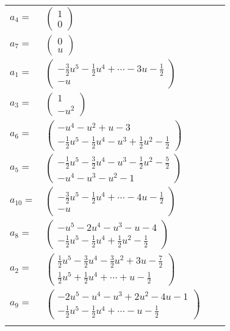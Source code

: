 \documentclass[1p]{elsarticle_modified}
\theoremstyle{definition}
\begin{document}
\begin{tabular}{m{7pt} m{180pt} m{7pt} m{180pt} }
\flushright $a_{4}=$&$\begin{pmatrix}1\\0\end{pmatrix}$ \\
\flushright $a_{7}=$&$\begin{pmatrix}0\\u\end{pmatrix}$ \\
\flushright $a_{1}=$&$\begin{pmatrix}-\frac{3}{2} u^5-\frac{1}{2} u^4+\cdots-3 u-\frac{1}{2}\\- u\end{pmatrix}$ \\
\flushright $a_{3}=$&$\begin{pmatrix}1\\- u^2\end{pmatrix}$ \\
\flushright $a_{6}=$&$\begin{pmatrix}- u^4- u^2+u-3\\-\frac{1}{2} u^5-\frac{1}{2} u^4- u^3+\frac{1}{2} u^2-\frac{1}{2}\end{pmatrix}$ \\
\flushright $a_{5}=$&$\begin{pmatrix}-\frac{1}{2} u^5-\frac{3}{2} u^4- u^3-\frac{1}{2} u^2-\frac{5}{2}\\- u^4- u^3- u^2-1\end{pmatrix}$ \\
\flushright $a_{10}=$&$\begin{pmatrix}-\frac{3}{2} u^5-\frac{1}{2} u^4+\cdots-4 u-\frac{1}{2}\\- u\end{pmatrix}$ \\
\flushright $a_{8}=$&$\begin{pmatrix}- u^5-2 u^4- u^3- u-4\\-\frac{1}{2} u^5-\frac{1}{2} u^4+\frac{1}{2} u^2-\frac{1}{2}\end{pmatrix}$ \\
\flushright $a_{2}=$&$\begin{pmatrix}\frac{1}{2} u^5-\frac{3}{2} u^4-\frac{3}{2} u^2+3 u-\frac{7}{2}\\\frac{1}{2} u^5+\frac{1}{2} u^4+\cdots+u-\frac{1}{2}\end{pmatrix}$ \\
\flushright $a_{9}=$&$\begin{pmatrix}-2 u^5- u^4- u^3+2 u^2-4 u-1\\-\frac{1}{2} u^5-\frac{1}{2} u^4+\cdots- u-\frac{1}{2}\end{pmatrix}$\\&\end{tabular}
\end{document}
